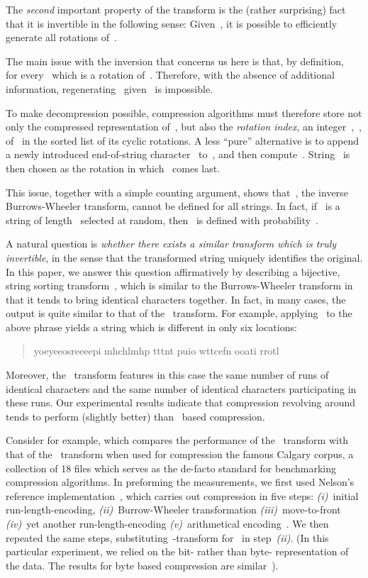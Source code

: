 \documentclass[a4paper,12pt]{article}
\numberwithin{algorithm}{section}
\begin{document}
The \emph{second} important property of the transform is the (rather surprising) fact that it is invertible
 in the following sense:
Given~, it is possible to
  efficiently generate all rotations of~.

The main issue with the inversion that concerns us here
  is that, by definition,~
  for every~ which is a  rotation of~.
Therefore, with the absence of additional information, regenerating~ given~
  is impossible.

To make decompression possible, compression algorithms must therefore store
   not only the compressed representation of~, but also the \emph{rotation index}, an integer~,~,
   of~ in the sorted list of its cyclic rotations.
A less “pure'' alternative is to append a newly introduced
   end-of-string character~ to~, and then compute~.
String~ is then chosen as the rotation in which~ comes last.

This issue, together with a simple counting argument, shows that~,
   the inverse Burrows-Wheeler transform, cannot be defined for all
   strings.
In fact, if~ is  a string of length~ selected at random,
   then~ is defined with probability~.

A natural question is \emph{whether there exists a similar transform which
  is truly invertible}, in the sense that the transformed string uniquely identifies the original.
In this paper, we answer this question affirmatively  by describing a bijective,
  string sorting transform~, which is similar to the Burrows-Wheeler transform
  in that it tends to bring identical characters together.
In fact, in many cases, the output is quite similar to that of the~ transform.
For example, applying~ to the above phrase  yields
  a string which is different in only six locations:
\begin{quote}
\begin{verbatim*}
yoeyeeosreeeepi mhchlmhp tttnt puio wttcefn  ooati       rrotl
\end{verbatim*}
\end{quote}
Moreover, the~ transform features in this case
  the same number of runs of identical characters and the same number
  of identical characters participating in these runs.
Our experimental results indicate that
  compression revolving around~ tends to perform (slightly better) than~
  based compression.

Consider for example,   which
compares the performance of the~ transform  with that of the~
transform  when used for compression the famous Calgary corpus, a collection of 18 files which serves as the de-facto standard
  for benchmarking compression algorithms.
In preforming the measurements, we first used Nelson's reference implementation~\cite{Nelson:96}, which carries out
compression in five steps:
\emph{(i)}~initial run-length-encoding,
\emph{(ii)}~Burrow-Wheeler transformation
\emph{(iii)}~move-to-front
\emph{(iv)}~yet another run-length-encoding
\emph{(v)}~arithmetical encoding~\cite{Witten:Neal:Cleary:87}.
We then repeated the same steps, substituting~-transform
 for~ in step~\emph{(ii)}.
(In this particular experiment, we relied on the bit- rather than byte- representation of the data.
The results for byte based compression are similar~\cite{Nagy:06}).
\end{document}
